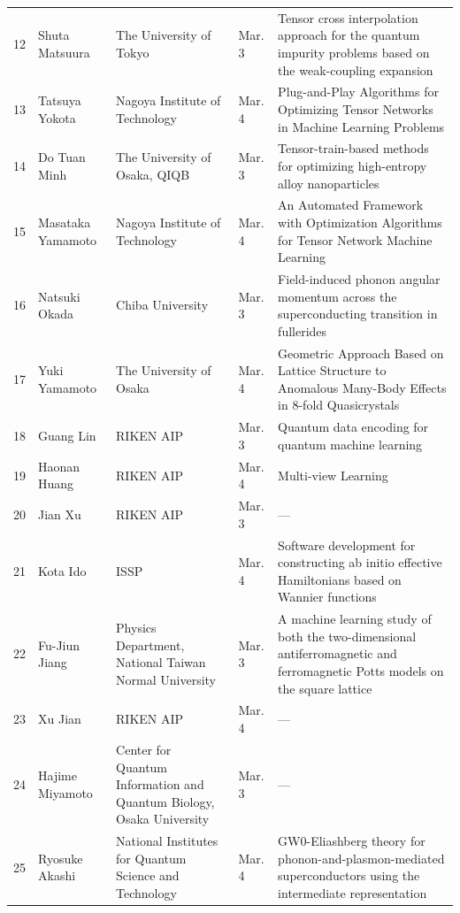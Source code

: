 \documentclass{article}
\begin{document}
\begin{longtable}{clp{4.5cm}p{3cm}p{8cm}}
12 & Shuta Matsuura      & The University of Tokyo & Mar. 3 & Tensor cross interpolation approach for the quantum impurity problems based on the weak-coupling expansion \\[4pt]
13 & Tatsuya Yokota      & Nagoya Institute of Technology & Mar. 4 & Plug-and-Play Algorithms for Optimizing Tensor Networks in Machine Learning Problems \\[4pt]
14 & Do Tuan Minh        & The University of Osaka, QIQB & Mar. 3 & Tensor-train-based methods for optimizing high-entropy alloy nanoparticles \\[4pt]
15 & Masataka Yamamoto   & Nagoya Institute of Technology & Mar. 4 & An Automated Framework with Optimization Algorithms for Tensor Network Machine Learning \\[4pt]
16 & Natsuki Okada       & Chiba University & Mar. 3 & Field-induced phonon angular momentum across the superconducting transition in fullerides \\[4pt]
17 & Yuki Yamamoto       & The University of Osaka & Mar. 4 & Geometric Approach Based on Lattice Structure to Anomalous Many-Body Effects in 8-fold Quasicrystals \\[4pt]
18 & Guang Lin           & RIKEN AIP & Mar. 3 & Quantum data encoding for quantum machine learning \\[4pt]
19 & Haonan Huang        & RIKEN AIP & Mar. 4 & Multi-view Learning \\[4pt]
20 & Jian Xu             & RIKEN AIP & Mar. 3 & --- \\[4pt]
21 & Kota Ido            & ISSP & Mar. 4 & Software development for constructing ab initio effective Hamiltonians based on Wannier functions \\[4pt]
22 & Fu-Jiun Jiang       & Physics Department, National Taiwan Normal University & Mar. 3 & A machine learning study of both the two-dimensional antiferromagnetic and ferromagnetic Potts models on the square lattice \\[4pt]
23 & Xu Jian             & RIKEN AIP & Mar. 4 & --- \\[4pt]
24 & Hajime Miyamoto     & Center for Quantum Information and Quantum Biology, Osaka University & Mar. 3 & --- \\[4pt]
25 & Ryosuke Akashi      & National Institutes for Quantum Science and Technology & Mar. 4 & GW0-Eliashberg theory for phonon-and-plasmon-mediated superconductors using the intermediate representation \\[4pt]
\end{longtable}
\end{document}
